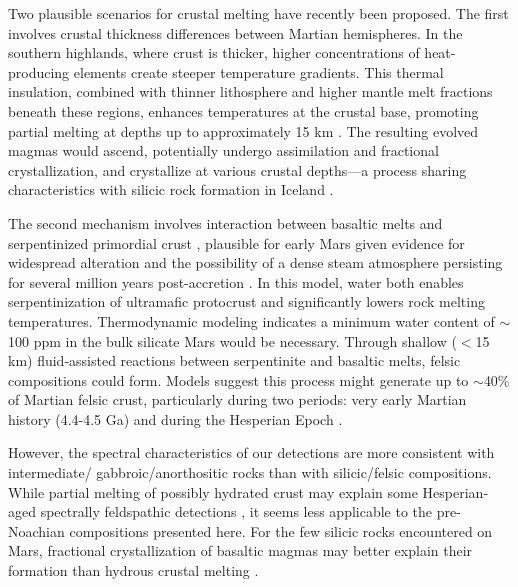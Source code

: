 \documentclass[11pt]{article}
\begin{document}
Two plausible scenarios for crustal melting have recently been proposed. The first involves crustal thickness differences between Martian hemispheres. In the southern highlands, where crust is thicker, higher concentrations of heat-producing elements create steeper temperature gradients. This thermal insulation, combined with thinner lithosphere and higher mantle melt fractions beneath these regions, enhances temperatures at the crustal base, promoting partial melting at depths up to approximately 15 km \citep{BonnetGibet2022, BonnetGibet2025}. The resulting evolved magmas would ascend, potentially undergo assimilation and fractional crystallization, and crystallize at various crustal depths---a process sharing characteristics with silicic rock formation in Iceland \citep{Jonasson2007, Martin2007, Martin2010}.

The second mechanism involves interaction between basaltic melts and serpentinized primordial crust \citep{Bernadet2025}, plausible for early Mars given evidence for widespread alteration \citep{Bibring2006, Bishop2008, Ehlmann2009, Ehlmann2014, Wordsworth2017, Viviano2023, Carter2023, Royer2024} and the possibility of a dense steam atmosphere persisting for several million years post-accretion \citep{Abe2011, Scherf2020}. In this model, water both enables serpentinization of ultramafic protocrust and significantly lowers rock melting temperatures. Thermodynamic modeling indicates a minimum water content of $\sim$100 ppm in the bulk silicate Mars would be necessary. Through shallow ($<$15 km) fluid-assisted reactions between serpentinite and basaltic melts, felsic compositions could form. Models suggest this process might generate up to $\sim$40\% of Martian felsic crust, particularly during two periods: very early Martian history (4.4-4.5 Ga) and during the Hesperian Epoch \citep{Bernadet2025}.

However, the spectral characteristics of our detections are more consistent with intermediate/ gabbroic/anorthositic rocks than with silicic/felsic compositions. While partial melting of possibly hydrated crust may explain some Hesperian-aged spectrally feldspathic detections \citep{Farrand2021, Rogers2022, Michalski2023}, it seems less applicable to the pre-Noachian compositions presented here. For the few silicic rocks encountered on Mars, fractional crystallization of basaltic magmas may better explain their formation than hydrous crustal melting \citep{Udry2018}.
\end{document}
